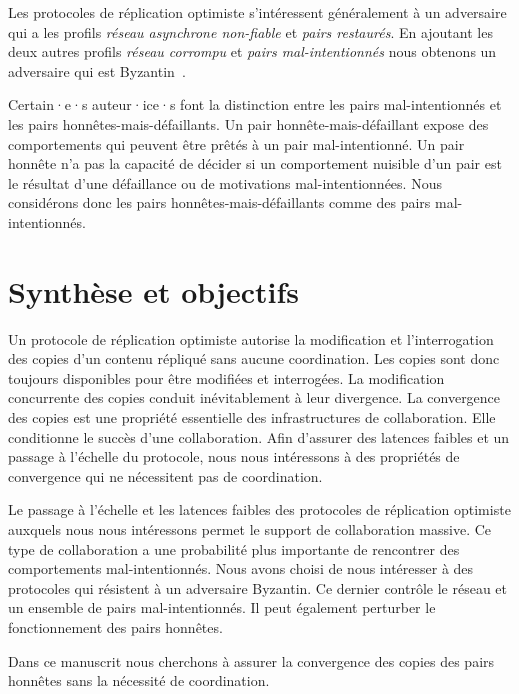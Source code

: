 Les protocoles de réplication optimiste s'intéressent généralement à un adversaire qui a les profils \emph{réseau asynchrone non-fiable} et \emph{pairs restaurés}.
En ajoutant les deux autres profils \emph{réseau corrompu} et \emph{pairs mal-intentionnés} nous obtenons un adversaire qui est Byzantin~\autocite{lamport_1982_byzantinegeneralsproblem}.

Certain·e·s auteur·ice·s font la distinction entre les pairs mal-intentionnés et les pairs honnêtes-mais-défaillants.
Un pair honnête-mais-défaillant expose des comportements qui peuvent être prêtés à un pair mal-intentionné.
Un pair honnête n'a pas la capacité de décider si un comportement nuisible d'un pair est le résultat d'une défaillance ou de motivations mal-intentionnées.
Nous considérons donc les pairs honnêtes-mais-défaillants comme des pairs mal-intentionnés.


\section{Synthèse et objectifs}

Un protocole de réplication optimiste autorise la modification et l'interrogation des copies d'un contenu répliqué sans aucune coordination.
Les copies sont donc toujours disponibles pour être modifiées et interrogées.
La modification concurrente des copies conduit inévitablement à leur divergence.
La convergence des copies est une propriété essentielle des infrastructures de collaboration.
Elle conditionne le succès d'une collaboration.
Afin d'assurer des latences faibles et un passage à l'échelle du protocole, nous nous intéressons à des propriétés de convergence qui ne nécessitent pas de coordination.

Le passage à l'échelle et les latences faibles des protocoles de réplication optimiste auxquels nous nous intéressons permet le support de collaboration massive.
Ce type de collaboration a une probabilité plus importante de rencontrer des comportements mal-intentionnés.
Nous avons choisi de nous intéresser à des protocoles qui résistent à un adversaire Byzantin.
Ce dernier contrôle le réseau et un ensemble de pairs mal-intentionnés.
Il peut également perturber le fonctionnement des pairs honnêtes.

Dans ce manuscrit nous cherchons à assurer la convergence des copies des pairs honnêtes sans la nécessité de coordination.
